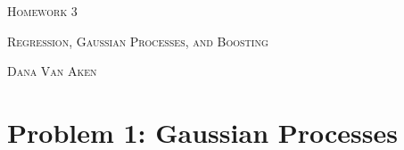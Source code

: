 \documentclass{article}
\begin{document}
\section*{}
\begin{center}
  \centerline{\textsc{\LARGE Homework 3}}
  \vspace{0.5em}
  \centerline{\textsc{Regression, Gaussian Processes, and Boosting}}
  \vspace{1em}
  \textsc{\large Dana Van Aken} \\
\end{center}

\section*{Problem 1: Gaussian Processes}

\begin{enumerate}[label=(\alph*)]
\setlength\itemsep{1em}


\end{enumerate}
\end{document}
